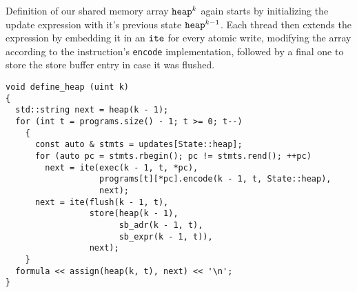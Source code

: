 \noindent
Definition of our shared memory array $\texttt{heap}^k$ again starts by initializing the update expression with it's previous state $\texttt{heap}^{k - 1}$.
Each thread then extends the expression by embedding it in an $\texttt{ite}$ for every atomic write, modifying the array according to the instruction's \texttt{encode} implementation, followed by a final one to store the store buffer entry in case it was flushed.
%

\begin{lstlisting}[style=c++]
void define_heap (uint k)
{
  std::string next = heap(k - 1);
  for (int t = programs.size() - 1; t >= 0; t--)
    {
      const auto & stmts = updates[State::heap];
      for (auto pc = stmts.rbegin(); pc != stmts.rend(); ++pc)
        next = ite(exec(k - 1, t, *pc),
                   programs[t][*pc].encode(k - 1, t, State::heap),
                   next);
      next = ite(flush(k - 1, t),
                 store(heap(k - 1),
                       sb_adr(k - 1, t),
                       sb_expr(k - 1, t)),
                 next);
    }
  formula << assign(heap(k, t), next) << '\n';
}
\end{lstlisting}

